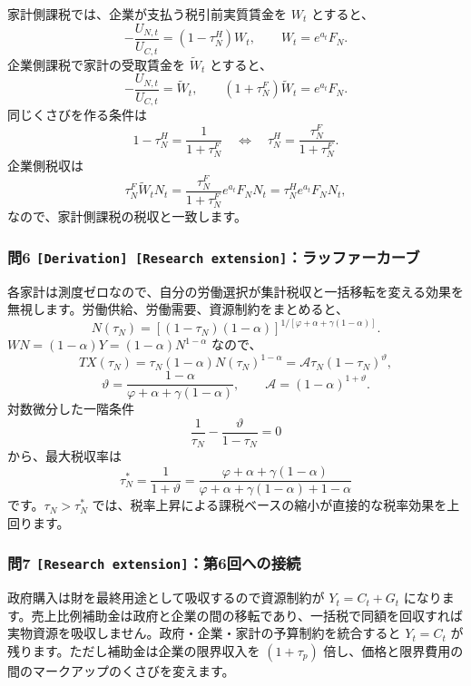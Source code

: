 \documentclass[
  japanese,
  lualatex,
  ja=standard,
  11pt,
  a4paper]{ltjsarticle}
\begin{document}
家計側課税では、企業が支払う税引前実質賃金を \(W_t\) とすると、 \[
-\frac{U_{N,t}}{U_{C,t}}=(1-\tau_N^H)W_t,
\qquad
W_t=e^{a_t}F_N.
\] 企業側課税で家計の受取賃金を \(\widetilde W_t\) とすると、 \[
-\frac{U_{N,t}}{U_{C,t}}=\widetilde W_t,
\qquad
(1+\tau_N^F)\widetilde W_t=e^{a_t}F_N.
\] 同じくさびを作る条件は \[
1-\tau_N^H=\frac{1}{1+\tau_N^F}
\quad\Longleftrightarrow\quad
\tau_N^H=\frac{\tau_N^F}{1+\tau_N^F}.
\] 企業側税収は \[
\tau_N^F\widetilde W_tN_t
=\frac{\tau_N^F}{1+\tau_N^F}e^{a_t}F_NN_t
=\tau_N^He^{a_t}F_NN_t,
\] なので、家計側課税の税収と一致します。

\subsubsection{\texorpdfstring{問6
\texttt{{[}Derivation{]}\ {[}Research\ extension{]}}：ラッファーカーブ}{問6 {[}Derivation{]} {[}Research extension{]}：ラッファーカーブ}}\label{ux554f6-derivation-research-extensionux30e9ux30c3ux30d5ux30a1ux30fcux30abux30fcux30d6}

各家計は測度ゼロなので、自分の労働選択が集計税収と一括移転を変える効果を無視します。労働供給、労働需要、資源制約をまとめると、
\[
N(\tau_N)
=\left[(1-\tau_N)(1-\alpha)\right]^{
1/[\varphi+\alpha+\gamma(1-\alpha)]}.
\] \(WN=(1-\alpha)Y=(1-\alpha)N^{1-\alpha}\) なので、 \[
TX(\tau_N)
=\tau_N(1-\alpha)N(\tau_N)^{1-\alpha}
=\mathcal A\tau_N(1-\tau_N)^\vartheta,
\] \[
\vartheta
=\frac{1-\alpha}{\varphi+\alpha+\gamma(1-\alpha)},
\qquad
\mathcal A=(1-\alpha)^{1+\vartheta}.
\] 対数微分した一階条件 \[
\frac1{\tau_N}-\frac{\vartheta}{1-\tau_N}=0
\] から、最大税収率は \[
\tau_N^*=\frac{1}{1+\vartheta}
=\frac{\varphi+\alpha+\gamma(1-\alpha)}
{\varphi+\alpha+\gamma(1-\alpha)+1-\alpha}
\] です。\(\tau_N>\tau_N^*\)
では、税率上昇による課税ベースの縮小が直接的な税率効果を上回ります。

\subsubsection{\texorpdfstring{問7
\texttt{{[}Research\ extension{]}}：第6回への接続}{問7 {[}Research extension{]}：第6回への接続}}\label{ux554f7-research-extensionux7b2c6ux56deux3078ux306eux63a5ux7d9a}

政府購入は財を最終用途として吸収するので資源制約が \(Y_t=C_t+G_t\)
になります。売上比例補助金は政府と企業の間の移転であり、一括税で同額を回収すれば実物資源を吸収しません。政府・企業・家計の予算制約を統合すると
\(Y_t=C_t\) が残ります。ただし補助金は企業の限界収入を \((1+\tau_p)\)
倍し、価格と限界費用の間のマークアップのくさびを変えます。
\end{document}
